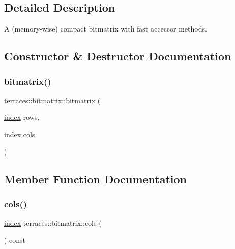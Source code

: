 \subsection{Detailed Description}
A (memory-\/wise) compact bitmatrix with fast acceccor methods. 

\subsection{Constructor \& Destructor Documentation}
\mbox{\label{classterraces_1_1bitmatrix_ab3210e10f4ffb9850325e93db17b9e0d}} 
\subsubsection{\texorpdfstring{bitmatrix()}{bitmatrix()}}
{\footnotesize\ttfamily terraces\+::bitmatrix\+::bitmatrix (\begin{DoxyParamCaption}\item[{\hyperlink{namespaceterraces_adbc33ccb543d1634e96d0eb02e472c77}{index}}]{rows,  }\item[{\hyperlink{namespaceterraces_adbc33ccb543d1634e96d0eb02e472c77}{index}}]{cols }\end{DoxyParamCaption})}



\subsection{Member Function Documentation}
\mbox{\label{classterraces_1_1bitmatrix_a55c1ef8f0554b8b82c2f4f86e8d4a0ef}} 
\subsubsection{\texorpdfstring{cols()}{cols()}}
{\footnotesize\ttfamily \hyperlink{namespaceterraces_adbc33ccb543d1634e96d0eb02e472c77}{index} terraces\+::bitmatrix\+::cols (\begin{DoxyParamCaption}{ }\end{DoxyParamCaption}) const}

\mbox{\label{classterraces_1_1bitmatrix_aef01e1c2bc601f43786343adf8b3876e}} 
